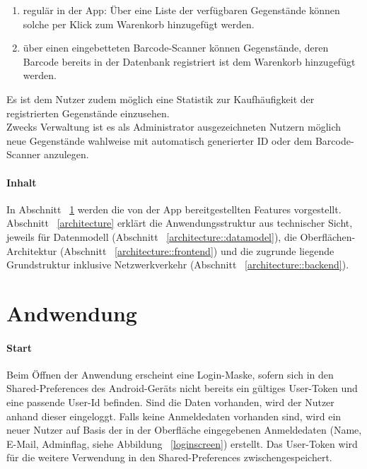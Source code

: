 \documentclass{scrartcl}
\begin{document}
		\begin{enumerate}
			\item regulär in der App: Über eine Liste der verfügbaren Gegenstände können solche per Klick zum Warenkorb hinzugefügt werden.
			
			\item über einen eingebetteten Barcode-Scanner können Gegenstände, deren Barcode bereits in der Datenbank registriert ist dem Warenkorb hinzugefügt werden.
		\end{enumerate}
	
		Es ist dem Nutzer zudem möglich eine Statistik zur Kaufhäufigkeit der registrierten Gegenstände einzusehen. \\
		Zwecks Verwaltung ist es als Administrator ausgezeichneten Nutzern möglich neue Gegenstände wahlweise mit automatisch generierter ID oder dem Barcode-Scanner anzulegen.
		
		\paragraph*{Inhalt}
		In Abschnitt ~\ref{features} werden die von der App bereitgestellten Features vorgestellt. Abschnitt ~\ref{architecture} erklärt die Anwendungsstruktur aus technischer Sicht, jeweils für Datenmodell (Abschnitt ~\ref{architecture::datamodel}), die Oberflächen-Architektur (Abschnitt ~\ref{architecture::frontend}) und die zugrunde liegende Grundstruktur inklusive Netzwerkverkehr (Abschnitt ~\ref{architecture::backend}).
		
		
	\section{Andwendung} \label{features}
		\paragraph*{Start}
		Beim Öffnen der Anwendung erscheint eine Login-Maske, sofern sich in den Shared-Preferences des Android-Geräts nicht bereits ein gültiges User-Token und eine passende User-Id befinden. Sind die Daten vorhanden, wird der Nutzer anhand dieser eingeloggt. Falls keine Anmeldedaten vorhanden sind, wird ein neuer Nutzer auf Basis der in der Oberfläche eingegebenen Anmeldedaten (Name, E-Mail, Adminflag, siehe Abbildung ~\ref{loginscreen}) erstellt. Das User-Token wird für die weitere Verwendung in den Shared-Preferences zwischengespeichert.
	
\end{document}
